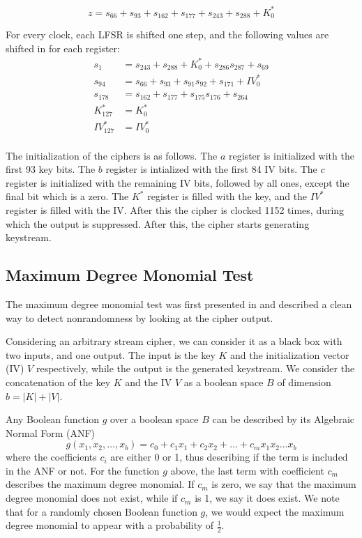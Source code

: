 {\[
z = s_{66} + s_{93} + s_{162} + s_{177} + s_{243} + s_{288} + K^*_0
\]

For every clock, each LFSR is shifted one step, and the following values are shifted in for each register:
\begin{align*}
s_1 &= s_{243} + s_{288} + K^*_0 + s_{286}s_{287} + s_{69} \\
s_{94} &= s_{66} + s_{93} + s_{91}s_{92} + s_{171} + IV^*_0 \\
s_{178} &= s_{162} + s_{177} + s_{175}s_{176} + s_{264} \\
K^*_{127} &= K^*_0 \\
IV^*_{127} &= IV^*_0 \\
\end{align*}

The initialization of the ciphers is as follows. The $a$ register is initialized with the first 93 key bits. The $b$ register is intialized with the first 84 IV bits. The $c$ register is initialized with the remaining IV bits, followed by all ones, except the final bit which is a zero. The $K^*$ register is filled with the key, and the $IV^*$ register is filled with the IV. After this the cipher is clocked 1152 times, during which the output is suppressed. After this, the cipher starts generating keystream.

\subsection{Maximum Degree Monomial Test}
The maximum degree monomial test was first presented in \cite{englund:2007} and described a clean way to detect nonrandomness by looking at the cipher output.

Considering an arbitrary stream cipher, we can consider it as a black box with two inputs, and one output. The input is the key $K$ and the initialization vector (IV) $V$ respectively, while the output is the generated keystream. We consider the concatenation of the key $K$ and the IV $V$ as a boolean space $B$ of dimension $b=|K| + |V|$.

Any Boolean function $g$ over a boolean space $B$ can be described by its Algebraic Normal Form (ANF)
\[
g(x_1, x_2, \ldots, x_b) = c_0 + c_1 x_1 + c_2 x_2 + \ldots + c_m x_1 x_2 \ldots x_b
\]
where the coefficients $c_i$ are either 0 or 1, thus describing if the term is included in the ANF or not. For the function $g$ above, the last term with coefficient $c_m$ describes the maximum degree monomial. If $c_m$ is zero, we say that the maximum degree monomial does not exist, while if $c_m$ is 1, we say it does exist. We note that for a randomly chosen Boolean function $g$, we would expect the maximum degree monomial to appear with a probability of $\frac{1}{2}$.

}
